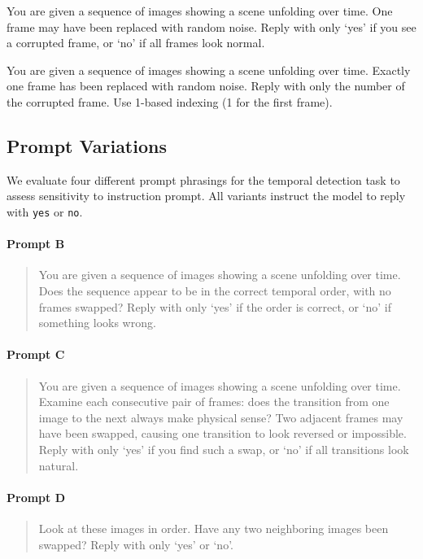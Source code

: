 \documentclass[11pt]{article}
\begin{document}
\begin{tcolorbox}[colback=gray!5,colframe=gray!40,title=Frame Detect]
You are given a sequence of images showing a scene unfolding over time. One frame may have been replaced with random noise. Reply with only `yes' if you see a corrupted frame, or `no' if all frames look normal.
\end{tcolorbox}

\begin{tcolorbox}[colback=gray!5,colframe=gray!40,title=Frame Localize]
You are given a sequence of images showing a scene unfolding over time. Exactly one frame has been replaced with random noise. Reply with only the number of the corrupted frame. Use 1-based indexing (1 for the first frame).
\end{tcolorbox}

\subsection{Prompt Variations}
We evaluate four different prompt phrasings for the temporal detection task to assess sensitivity to instruction prompt. All variants instruct the model to reply with \texttt{yes} or \texttt{no}.

\paragraph{Prompt B}
\begin{quote}
\ttfamily
You are given a sequence of images showing a scene unfolding over
time. Does the sequence appear to be in the correct temporal order, with
no frames swapped? Reply with only `yes' if the order is correct, or
`no' if something looks wrong.
\end{quote}

\paragraph{Prompt C}
\begin{quote}
\ttfamily
You are given a sequence of images showing a scene unfolding over
time. Examine each consecutive pair of frames: does the transition from
one image to the next always make physical sense? Two adjacent frames may
have been swapped, causing one transition to look reversed or impossible.
Reply with only `yes' if you find such a swap, or `no' if all transitions
look natural.
\end{quote}

\paragraph{Prompt D}
\begin{quote}
\ttfamily
Look at these images in order. Have any two neighboring images
been swapped? Reply with only `yes' or `no'.
\end{quote}
\end{document}
